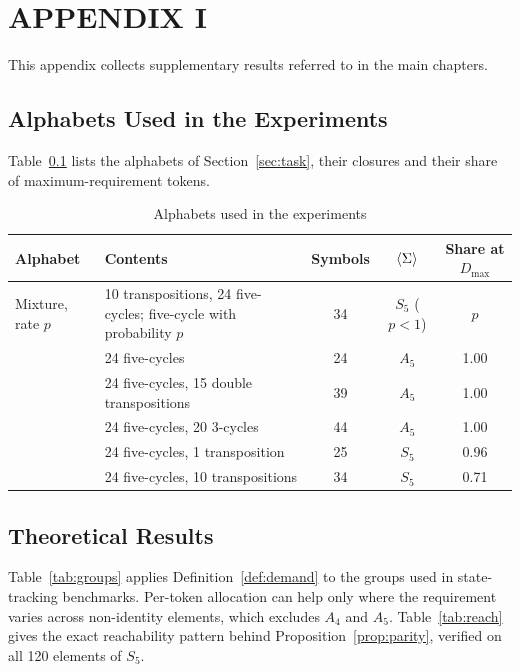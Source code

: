\chapter*{APPENDIX I}
\label{app:one}
\setcounter{section}{0}
\renewcommand{\thesection}{A.\arabic{section}}
This appendix collects supplementary results referred to in the main chapters.

\section{Alphabets Used in the Experiments}
Table~\ref{tab:alphabets} lists the alphabets of Section~\ref{sec:task}, their closures and their share of maximum-requirement tokens.

\begin{table}[ht]
	\caption{Alphabets used in the experiments}
	\centering
	\footnotesize
	\setlength{\tabcolsep}{4pt}
	\begin{tabular}{p{3.6cm} p{3.9cm} c c c}
		\toprule
		\textbf{Alphabet} & \textbf{Contents} & \textbf{Symbols} & $\langle \Sigma \rangle$ & \textbf{Share at $D_{\max}$} \\
		\midrule
		Mixture, rate $p$ & 10 transpositions, 24 five-cycles; five-cycle with probability $p$ & 34 & $S_5$ ($p<1$) & $p$ \\
		\alA & 24 five-cycles & 24 & $A_5$ & 1.00 \\
		\alB & 24 five-cycles, 15 double transpositions & 39 & $A_5$ & 1.00 \\
		\alC & 24 five-cycles, 20 3-cycles & 44 & $A_5$ & 1.00 \\
		\alD & 24 five-cycles, 1 transposition & 25 & $S_5$ & 0.96 \\
		\alE & 24 five-cycles, 10 transpositions & 34 & $S_5$ & 0.71 \\
		\bottomrule
	\end{tabular}
	\label{tab:alphabets}
\end{table}

\FloatBarrier
\section{Theoretical Results}
Table~\ref{tab:groups} applies Definition~\ref{def:demand} to the groups used in state-tracking benchmarks. Per-token allocation can help only where the requirement varies across non-identity elements, which excludes $A_4$ and $A_5$. Table~\ref{tab:reach} gives the exact reachability pattern behind Proposition~\ref{prop:parity}, verified on all 120 elements of $S_5$.

